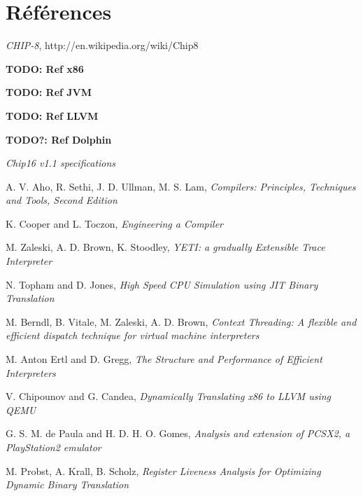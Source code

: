 \documentclass{article} %
\begin{document}
\section{Références}
\small{
\textit{CHIP-8}, http://en.wikipedia.org/wiki/Chip8

\textbf{TODO: Ref x86}

\textbf{TODO: Ref JVM}

\textbf{TODO: Ref LLVM}

\textbf{TODO?: Ref Dolphin}

\textit{Chip16 v1.1 specifications}

A. V. Aho, R. Sethi, J. D. Ullman, M. S. Lam, \textit{Compilers: Principles, Techniques and Tools, Second Edition}

K. Cooper and L. Toczon, \textit{Engineering a Compiler}

M. Zaleski, A. D. Brown, K. Stoodley, \textit{YETI: a gradually Extensible Trace Interpreter}

N. Topham and D. Jones, \textit{High Speed CPU Simulation using JIT Binary Translation}

M. Berndl, B. Vitale, M. Zaleski, A. D. Brown, \textit{Context Threading: A flexible and efficient dispatch technique for virtual machine interpreters}

M. Anton Ertl and D. Gregg, \textit{The Structure and Performance of Efficient Interpreters}

V. Chipounov and G. Candea, \textit{Dynamically Translating x86 to LLVM using QEMU}

G. S. M. de Paula and H. D. H. O. Gomes, \textit{Analysis and extension of PCSX2, a PlayStation2 emulator}

M. Probst, A. Krall, B. Scholz, \textit{Register Liveness Analysis for Optimizing Dynamic Binary Translation}
}
\end{document}
